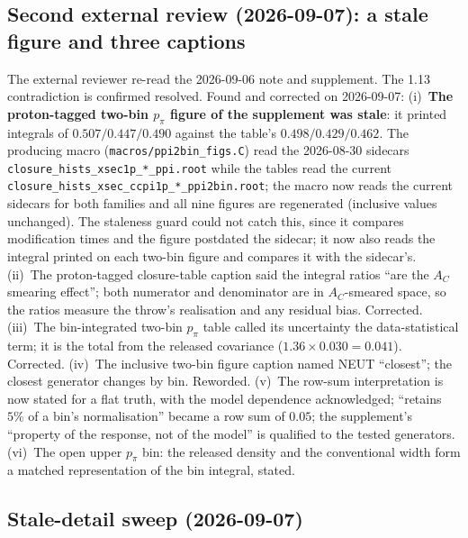 \subsection{Second external review (2026-09-07): a stale figure and three captions}

The external reviewer re-read the 2026-09-06 note and supplement. The 1.13 contradiction is
confirmed resolved. Found and corrected on 2026-09-07:
(i)~\textbf{The proton-tagged two-bin $p_\pi$ figure of the supplement was stale}: it
printed integrals of $0.507/0.447/0.490$ against the table's $0.498/0.429/0.462$. The
producing macro (\texttt{macros/ppi2bin\_figs.C}) read the 2026-08-30 sidecars
\texttt{closure\_hists\_xsec1p\_*\_ppi.root} while the tables read the current
\texttt{closure\_hists\_xsec\_ccpi1p\_*\_ppi2bin.root}; the macro now reads the current
sidecars for both families and all nine figures are regenerated (inclusive values
unchanged). The staleness guard could not catch this, since it compares modification
times and the figure postdated the sidecar; it now also reads the integral printed on
each two-bin figure and compares it with the sidecar's.
(ii)~The proton-tagged closure-table caption said the integral ratios ``are the $A_C$
smearing effect''; both numerator and denominator are in $A_C$-smeared space, so the
ratios measure the throw's realisation and any residual bias. Corrected.
(iii)~The bin-integrated two-bin $p_\pi$ table called its uncertainty the data-statistical
term; it is the total from the released covariance ($1.36\times0.030=0.041$). Corrected.
(iv)~The inclusive two-bin figure caption named NEUT ``closest''; the closest generator
changes by bin. Reworded. (v)~The row-sum interpretation is now stated for a flat truth,
with the model dependence acknowledged; ``retains $5\%$ of a bin's normalisation'' became a
row sum of $0.05$; the supplement's ``property of the response, not of the model'' is
qualified to the tested generators. (vi)~The open upper $p_\pi$ bin: the released density
and the conventional width form a matched representation of the bin integral, stated.

\subsection{Stale-detail sweep (2026-09-07)}

